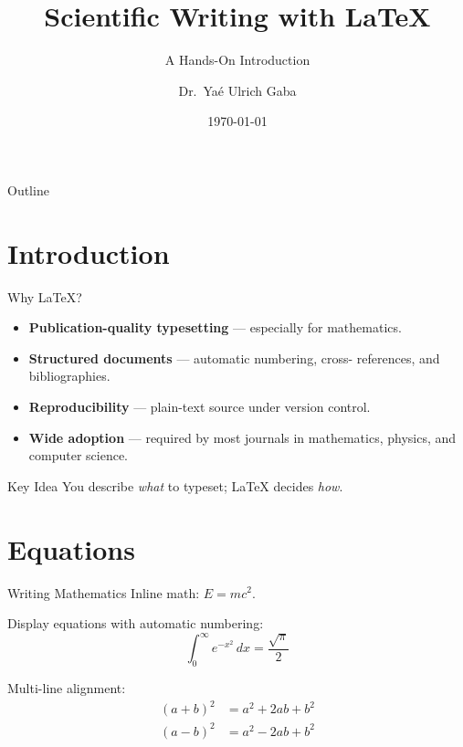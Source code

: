 \documentclass[aspectratio=169]{beamer}
\title[LaTeX Workshop]{Scientific Writing with LaTeX}
\subtitle{A Hands-On Introduction}
\author[Y.~U.~Gaba]{Dr.\ Ya\'{e} Ulrich Gaba}
\institute[AIRINA Labs]{AIRINA Labs \\ \texttt{gaba@airina.io}}
\date{\today}
\begin{document}
\begin{frame}
    \titlepage
\end{frame}

\begin{frame}{Outline}
    \tableofcontents
\end{frame}

\section{Introduction}

\begin{frame}{Why \LaTeX{}?}
    \begin{itemize}
        \item \textbf{Publication-quality typesetting} — especially for
              mathematics.
        \item \textbf{Structured documents} — automatic numbering, cross-%
              references, and bibliographies.
        \item \textbf{Reproducibility} — plain-text source under version
              control.
        \item \textbf{Wide adoption} — required by most journals in
              mathematics, physics, and computer science.
    \end{itemize}

    \vspace{1em}
    \begin{block}{Key Idea}
        You describe \emph{what} to typeset; \LaTeX{} decides \emph{how}.
    \end{block}
\end{frame}

\section{Equations}

\begin{frame}{Writing Mathematics}
    Inline math: $E = mc^{2}$.

    \medskip
    Display equations with automatic numbering:
    \begin{equation}
        \int_{0}^{\infty} e^{-x^{2}} \, dx = \frac{\sqrt{\pi}}{2}
    \end{equation}

    \medskip
    Multi-line alignment:
    \begin{align}
        (a + b)^{2} &= a^{2} + 2ab + b^{2} \\
        (a - b)^{2} &= a^{2} - 2ab + b^{2}
    \end{align}
\end{frame}
\end{document}
